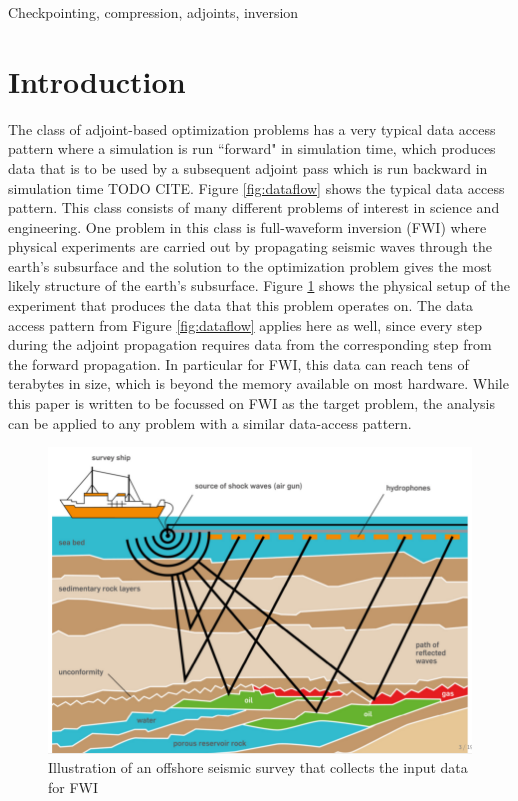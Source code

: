 \documentclass[conference]{IEEEtran}
\begin{document}
\begin{IEEEkeywords}
Checkpointing, compression, adjoints, inversion
\end{IEEEkeywords}

\section{Introduction}
The class of adjoint-based optimization problems has a very typical data access pattern where a
simulation is run ``forward" in simulation time, which produces data that is to be used by a
subsequent adjoint pass which is run backward in simulation time TODO CITE. Figure \ref{fig:dataflow}
shows the typical data access pattern. This class consists of many different problems of interest in
science and engineering. One problem in this class is full-waveform inversion (FWI) where physical
experiments are carried out by propagating seismic waves through the earth's subsurface and the
solution to the optimization problem gives the most likely structure of the earth's subsurface. Figure
\ref{fig:offshore_survey} shows the physical setup of the experiment that produces the data that this problem operates
on. The data access pattern from Figure \ref{fig:dataflow} applies here as well, since every step during the
adjoint propagation requires data from the corresponding step from the forward propagation. In
particular for FWI, this data can reach tens of terabytes in size, which is beyond the memory
available on most hardware. While this paper is written to be focussed on FWI as the target problem, 
the analysis can be applied to any problem with a similar data-access pattern. 

\begin{figure}
\begin{center}
\includegraphics[width=0.8\linewidth]{images/survey-ship-diagram.png}
\end{center}
\caption{Illustration of an offshore seismic survey that collects the input data for FWI}
\label{fig:offshore_survey}
\end{figure}
\end{document}

